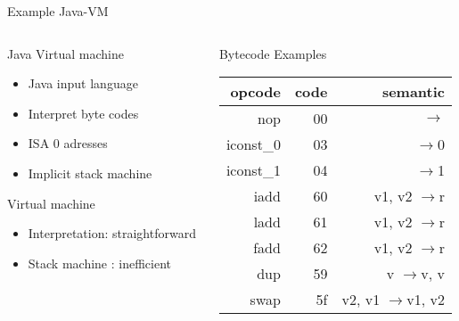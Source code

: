 %
\begin{Frame}{Example Java-VM}
  \begin{columns}[t]
    \begin{column}{\BW} %
      \begin{block}{Java Virtual machine}
        \begin{itemize}
        \item Java input language
        \item Interpret byte codes
        \item ISA 0 adresses
        \item Implicit stack machine
        \end{itemize}
      \end{block} 
      \begin{block}{Virtual machine}
        \begin{itemize}
        \item Interpretation: straightforward
        \item Stack machine : inefficient
        \end{itemize}
      \end{block} 
    \end{column}
\newcommand{\RA}{$\rightarrow$}
    \begin{column}{\BW} %
      \begin{block}{Bytecode Examples}
\footnotesize       \begin{tabular}{|r r r|}\hline{}
opcode       & code & semantic \\ \hline
nop 	     & 00 &	\RA\\
iconst\_0    & 03 &	\RA 0 \\
iconst\_1    & 04 &	\RA 1 \\
iadd 	     & 60 &	v1, v2 \RA r\\ 
ladd 	     & 61 &	v1, v2 \RA r \\
fadd 	     & 62 &	v1, v2 \RA r \\
dup  	     & 59 &	v \RA v, v \\
swap 	     & 5f & v2, v1 \RA v1, v2\\
\hline
        \end{tabular}
      \end{block}   
    \end{column}
  \end{columns}  
\end{Frame}


